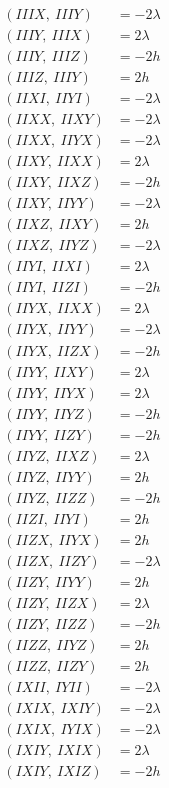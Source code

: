 \documentclass{article}
\begin{document}
\begin{align*}
  (IIIX,\ IIIY) &= - 2 \lambda \\
  (IIIY,\ IIIX) &= 2 \lambda \\
  (IIIY,\ IIIZ) &= - 2 h \\
  (IIIZ,\ IIIY) &= 2 h \\
  (IIXI,\ IIYI) &= - 2 \lambda \\
  (IIXX,\ IIXY) &= - 2 \lambda \\
  (IIXX,\ IIYX) &= - 2 \lambda \\
  (IIXY,\ IIXX) &= 2 \lambda \\
  (IIXY,\ IIXZ) &= - 2 h \\
  (IIXY,\ IIYY) &= - 2 \lambda \\
  (IIXZ,\ IIXY) &= 2 h \\
  (IIXZ,\ IIYZ) &= - 2 \lambda \\
  (IIYI,\ IIXI) &= 2 \lambda \\
  (IIYI,\ IIZI) &= - 2 h \\
  (IIYX,\ IIXX) &= 2 \lambda \\
  (IIYX,\ IIYY) &= - 2 \lambda \\
  (IIYX,\ IIZX) &= - 2 h \\
  (IIYY,\ IIXY) &= 2 \lambda \\
  (IIYY,\ IIYX) &= 2 \lambda \\
  (IIYY,\ IIYZ) &= - 2 h \\
  (IIYY,\ IIZY) &= - 2 h \\
  (IIYZ,\ IIXZ) &= 2 \lambda \\
  (IIYZ,\ IIYY) &= 2 h \\
  (IIYZ,\ IIZZ) &= - 2 h \\
  (IIZI,\ IIYI) &= 2 h \\
  (IIZX,\ IIYX) &= 2 h \\
  (IIZX,\ IIZY) &= - 2 \lambda \\
  (IIZY,\ IIYY) &= 2 h \\
  (IIZY,\ IIZX) &= 2 \lambda \\
  (IIZY,\ IIZZ) &= - 2 h \\
  (IIZZ,\ IIYZ) &= 2 h \\
  (IIZZ,\ IIZY) &= 2 h \\
  (IXII,\ IYII) &= - 2 \lambda \\
  (IXIX,\ IXIY) &= - 2 \lambda \\
  (IXIX,\ IYIX) &= - 2 \lambda \\
  (IXIY,\ IXIX) &= 2 \lambda \\
  (IXIY,\ IXIZ) &= - 2 h \\

\end{align*}
\end{document}
